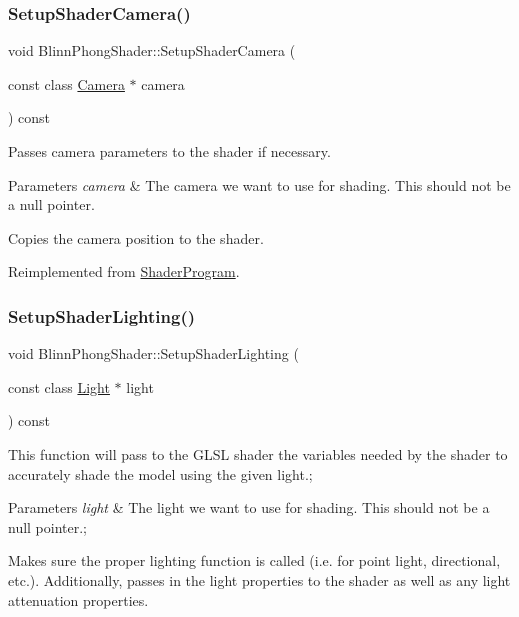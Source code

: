 \subsubsection{\texorpdfstring{Setup\+Shader\+Camera()}{SetupShaderCamera()}}
{\footnotesize\ttfamily void Blinn\+Phong\+Shader\+::\+Setup\+Shader\+Camera (\begin{DoxyParamCaption}\item[{const class \hyperlink{class_camera}{Camera} $\ast$}]{camera }\end{DoxyParamCaption}) const\hspace{0.3cm}{\ttfamily [virtual]}}



Passes camera parameters to the shader if necessary. 


\begin{DoxyParams}{Parameters}
{\em camera} & The camera we want to use for shading. This should not be a null pointer.\\
\hline
\end{DoxyParams}
Copies the camera position to the shader. 

Reimplemented from \hyperlink{class_shader_program_abefd4e66aae75993f05bd607b6b0ed22}{Shader\+Program}.

\hypertarget{class_blinn_phong_shader_a812ffd751068ae3bfc131ddb27712941}{}\label{class_blinn_phong_shader_a812ffd751068ae3bfc131ddb27712941} 
\subsubsection{\texorpdfstring{Setup\+Shader\+Lighting()}{SetupShaderLighting()}}
{\footnotesize\ttfamily void Blinn\+Phong\+Shader\+::\+Setup\+Shader\+Lighting (\begin{DoxyParamCaption}\item[{const class \hyperlink{class_light}{Light} $\ast$}]{light }\end{DoxyParamCaption}) const\hspace{0.3cm}{\ttfamily [virtual]}}



This function will pass to the G\+L\+SL shader the variables needed by the shader to accurately shade the model using the given light.; 


\begin{DoxyParams}{Parameters}
{\em light} & The light we want to use for shading. This should not be a null pointer.;\\
\hline
\end{DoxyParams}
Makes sure the proper lighting function is called (i.\+e. for point light, directional, etc.). Additionally, passes in the light properties to the shader as well as any light attenuation properties. 

